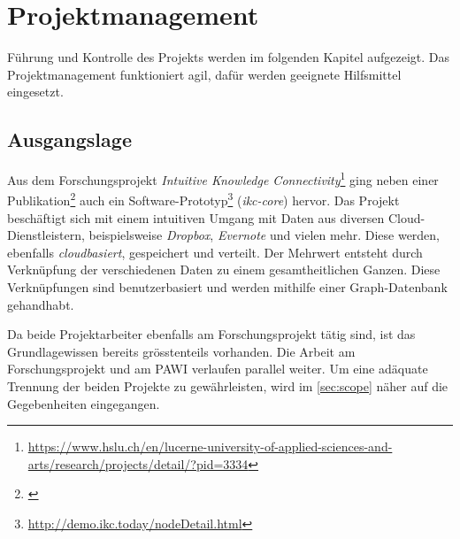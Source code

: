 \chapter{Projektmanagement}

Führung und Kontrolle des Projekts werden im folgenden Kapitel aufgezeigt. Das Projektmanagement funktioniert agil, dafür werden geeignete Hilfsmittel eingesetzt. 

\section{Ausgangslage}
Aus dem Forschungsprojekt \textit{Intuitive Knowledge Connectivity}\footnote{\url{https://www.hslu.ch/en/lucerne-university-of-applied-sciences-and-arts/research/projects/detail/?pid=3334}} ging neben einer Publikation\footnote{\cite{ikcpaper:hslu}} auch ein Software-Prototyp\footnote{\url{http://demo.ikc.today/nodeDetail.html}} (\textit{ikc-core}) hervor. Das Projekt beschäftigt sich mit einem intuitiven Umgang mit Daten aus diversen Cloud-Dienstleistern, beispielsweise \textit{Dropbox}, \textit{Evernote} und vielen mehr. Diese werden, ebenfalls \textit{cloudbasiert}, gespeichert und verteilt. Der Mehrwert entsteht durch Verknüpfung der verschiedenen Daten zu einem gesamtheitlichen Ganzen. Diese Verknüpfungen sind be\-nutzer\-bas\-iert und werden mithilfe einer Graph-Datenbank gehandhabt.

Da beide Projektarbeiter ebenfalls am Forschungsprojekt tätig sind, ist das Grundlagewissen bereits grösstenteils vorhanden. Die Arbeit am Forschungsprojekt und am PAWI verlaufen parallel weiter. Um eine adäquate Trennung der beiden Projekte zu gewährleisten, wird im \autoref{sec:scope} näher auf die Gegebenheiten eingegangen.

